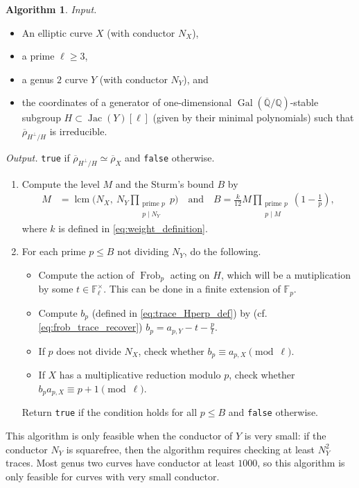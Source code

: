 \documentclass{amsproc}
\numberwithin{equation}{section}
\theoremstyle{definition}
\newtheorem{algorithm}[equation]{Algorithm}
\theoremstyle{remark}
\DeclareMathOperator{\Jac}{Jac}
\DeclareMathOperator{\Frob}{Frob}
\DeclareMathOperator{\Gal}{Gal}
\DeclareMathOperator{\lcm}{lcm}
\newcommand{\QQ}{\mathbb Q}
\newcommand{\FF}{\mathbb F}
\newcommand{\Qbar}{\overline{\QQ}}
\newcommand{\GalQ}{\Gal(\Qbar/\QQ)}
\newcommand{\rhoHperpH}{\overline\rho_{H^\perp\!/H}}
\begin{document}
\begin{algorithm}
    \label{alg:proving_isomorphism}
    \emph{Input.} 
    \begin{itemize}
   \item An elliptic curve $X$ (with conductor $N_X$),
   \item a prime $\ell\geq 3$,
    \item a genus $2$ curve $Y$ (with conductor $N_Y$), and
    \item the coordinates of a generator of one-dimensional
    $\GalQ$-stable subgroup $H\subset \Jac(Y)[\ell]$
    (given by their minimal polynomials)
    such that $\rhoHperpH$ is irreducible.
    \end{itemize}
    \emph{Output.} \texttt{true} if $\rhoHperpH\simeq\overline\rho_X$ and \texttt{false} otherwise.
    \begin{enumerate}[label=(\arabic*)]
    \item Compute the level $M$ and the Sturm's bound $B$ by
    \begin{equation}
    \begin{split}
        \label{eq:M}
        M &= \lcm\Bigg(N_X,\ N_Y \prod_{\substack{\text{prime } p \\ p\mid N_Y}} p\Bigg) \quad \text{and}  \quad
        B =\tfrac{k}{12} M \prod_{\substack{\text{prime } p \\ p\mid M}} \left(1-\tfrac 1p\right),
    \end{split}
    \end{equation}
    where $k$ is defined in \eqref{eq:weight_definition}.
    \item For each prime $p\leq B$ not dividing $N_Y$, do the following.
    \begin{itemize}
        \item Compute the action of $\Frob_p$ acting on $H$, which will be a mutiplication by some $t\in\FF_\ell^\times$. This can be done in a finite extension of $\FF_p$.
        \item Compute $b_p$ (defined in \eqref{eq:trace_Hperp_def}) by (cf. \eqref{eq:frob_trace_recover})
        $b_p = a_{p,Y} - t - \frac pt$.
        \item If $p$ does not divide $N_X$, check whether
        $b_p\equiv a_{p,X}\pmod{\ell}$.
        \item If $X$ has a multiplicative reduction modulo $p$,
        check whether $b_p a_{p,X}\equiv p+1\pmod{\ell}$.
    \end{itemize}
    Return \texttt{true} if the condition holds for all $p \leq B$ and \texttt{false} otherwise.
    \end{enumerate}
\end{algorithm}
This algorithm is only feasible
when the conductor of $Y$ is very small: if the conductor $N_Y$ is squarefree, then the algorithm requires checking at least $N_Y^2$ traces. Most genus two curves have conductor at least $1000$, so this algorithm is only feasible for curves with very small conductor.
\end{document}
